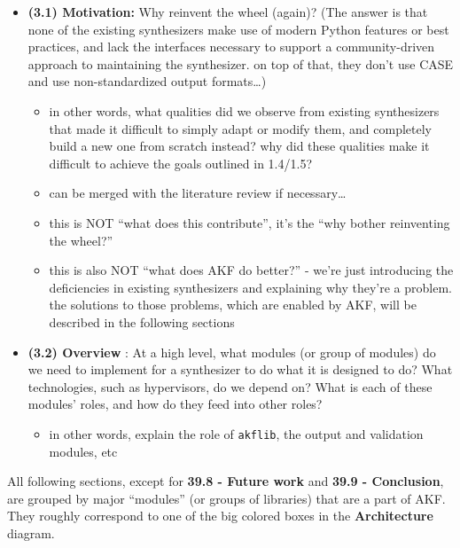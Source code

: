 \begin{itemize}
\tightlist
\item
  \textbf{(3.1) Motivation:} Why reinvent the wheel (again)? (The answer
  is that none of the existing synthesizers make use of modern Python
  features or best practices, and lack the interfaces necessary to
  support a community-driven approach to maintaining the synthesizer. on
  top of that, they don't use CASE and use non-standardized output
  formats\ldots)

  \begin{itemize}
  \tightlist
  \item
    in other words, what qualities did we observe from existing
    synthesizers that made it difficult to simply adapt or modify them,
    and completely build a new one from scratch instead? why did these
    qualities make it difficult to achieve the goals outlined in
    1.4/1.5?
  \item
    can be merged with the literature review if necessary\ldots{}
  \item
    this is NOT ``what does this contribute'', it's the ``why bother
    reinventing the wheel?''
  \item
    this is also NOT ``what does AKF do better?'' - we're just
    introducing the deficiencies in existing synthesizers and explaining
    why they're a problem. the solutions to those problems, which are
    enabled by AKF, will be described in the following sections
  \end{itemize}
\item
  \textbf{(3.2) Overview} : At a high level, what modules (or group of
  modules) do we need to implement for a synthesizer to do what it is
  designed to do? What technologies, such as hypervisors, do we depend
  on? What is each of these modules' roles, and how do they feed into
  other roles?

  \begin{itemize}
  \tightlist
  \item
    in other words, explain the role of \texttt{akflib}, the output and
    validation modules, etc
  \end{itemize}
\end{itemize}

All following sections, except for \textbf{39.8 - Future work} and
\textbf{39.9 - Conclusion}, are grouped by major ``modules'' (or groups
of libraries) that are a part of AKF. They roughly correspond to one of
the big colored boxes in the \textbf{Architecture} diagram.

